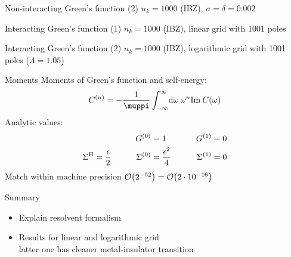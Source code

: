 \documentclass[aspectratio=169]{beamer}
\begin{document}
\begin{frame}{Non-interacting Green's function (2)}
    $n_k = 1000$ (IBZ), $\sigma = \delta = 0.002$

    \begin{centering}
        
    \end{centering}
\end{frame}

\begin{frame}{Interacting Green's function (1)}
    $n_k = 1000$ (IBZ), linear grid with 1001 poles

    \begin{centering}
        
    \end{centering}
\end{frame}

\begin{frame}{Interacting Green's function (2)}
    $n_k = 1000$ (IBZ), logarithmic grid with 1001 poles ($\Lambda = 1.05$)

    \begin{centering}
        
    \end{centering}
\end{frame}

\begin{frame}{Moments}
    Moments of Green's function and self-energy:
    \begin{equation}
        C^{(n)} = -\frac{1}{\muppi} \int_{-\infty}^\infty\! \md\omega\> \omega^n \Im C(\omega)
    \end{equation}
    Analytic values:
    \begin{alignat}{3}
                   &                      & G^{(0)}             & = 1                    & \qquad G^{(1)}      & = 0 \\
        \Sigma^{\mathrm{H}} & = \frac{\epsilon}{2} & \qquad \Sigma^{(0)} & = \frac{\epsilon^2}{4} & \qquad \Sigma^{(1)} & = 0
    \end{alignat}
    Match within machine precision $\mathcal{O}\!\left(2^{-52}\right)=\mathcal{O}\!\left(2\cdot10^{-16}\right)$
\end{frame}

\begin{frame}{Summary}
    \begin{itemize}
        \item Explain resolvent formalism
        \item Results for linear and logarithmic grid \\
              latter one has cleaner metal-insulator transition
    \end{itemize}
\end{frame}
\end{document}
